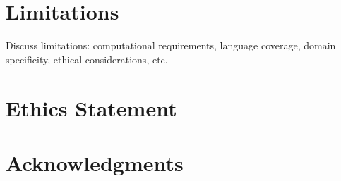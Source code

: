 \documentclass[11pt,a4paper]{article}
\begin{document}
\section*{Limitations}

Discuss limitations: computational requirements, language coverage,
domain specificity, ethical considerations, etc.

\section*{Ethics Statement}

\section*{Acknowledgments}

{
  \small
  
  
}
\end{document}
